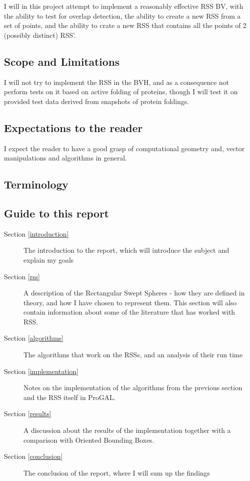 I will in this project attempt to implement a reasonably effective RSS BV, with the ability to test for overlap detection, the ability to create a new RSS from a set of points, and the ability to crate a new RSS that contains all the points of 2 (possibly distinct) RSS'.

\subsection{Scope and Limitations}
\label{scope}
I will not try to implement the RSS in the BVH, and as a consequence not perform tests on it based on active folding of proteins, though I will test it on provided test data derived from snapshots of protein foldings.

\subsection{Expectations to the reader}
I expect the reader to have a good grasp of computational geometry and, vector manipulations and algorithms in general.

\subsection{Terminology}

\subsection{Guide to this report}
\begin{description}
\item[Section \ref{introduction}] The introduction to the report, which will introduce the subject and explain my goals
\item[Section \ref{rss}] A description of the Rectangular Swept Spheres - how they are defined in theory, and how I have chosen to represent them. This section will also contain information about some of the literature that has worked with RSS.
\item[Section \ref{algorithms}] The algorithms that work on the RSSs, and an analysis of their run time 
\item[Section \ref{implementation}] Notes on the implementation of the algorithms from the previous section and the RSS itself in ProGAL.
\item[Section \ref{results}] A discussion about the results of the implementation together with a comparison with Oriented Bounding Boxes. 
\item[Section \ref{conclusion}] The conclusion of the report, where I will sum up the findings 
\end{description}

